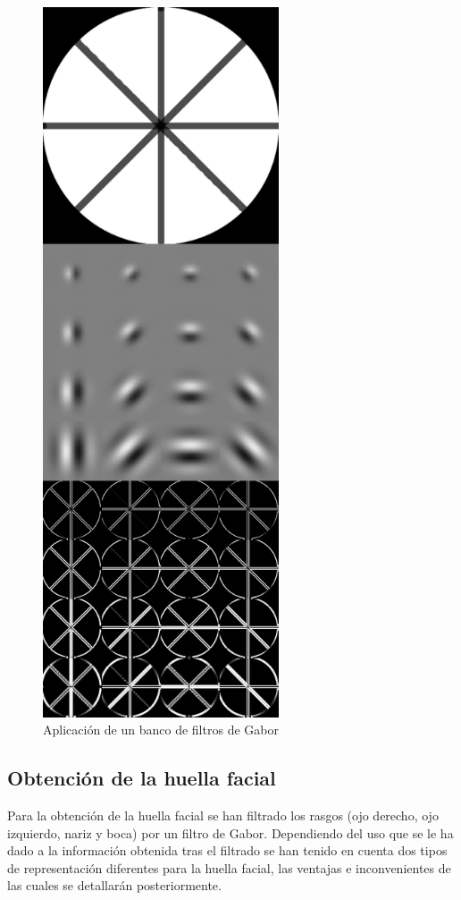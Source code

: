 \begin{figure}[h!]
        \centering
	\includegraphics[height=21cm]{imagenes/Gabor.png}
        \caption{Aplicación de un banco de filtros de Gabor}
	\label{fig:gabor_example}
\end{figure}

\subsection{Obtención de la huella facial}
Para la obtención de la huella facial se han filtrado los rasgos (ojo derecho, ojo izquierdo, nariz y boca) por un filtro de Gabor. Dependiendo del uso que se le ha dado a la información obtenida tras el filtrado se han tenido en cuenta dos tipos de representación diferentes para la huella facial, las ventajas e inconvenientes de las cuales se detallarán posteriormente.

